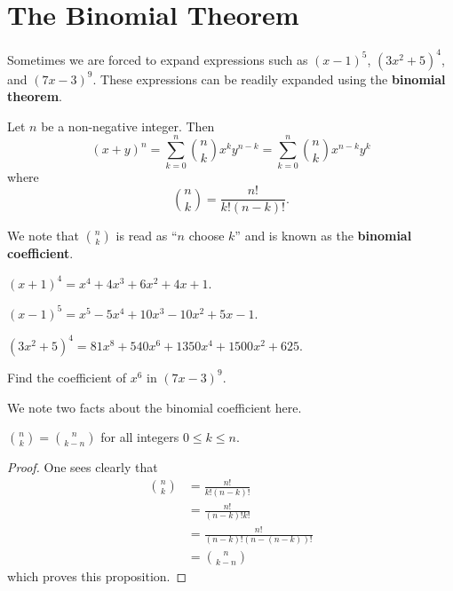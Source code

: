 \section{The Binomial Theorem}
Sometimes we are forced to expand expressions such as $(x-1)^5$, $(3x^2 + 5)^4$, and $(7x - 3)^9$. These expressions can be readily expanded using the \textbf{binomial theorem}.
\begin{theorem}\label{thrm-binomial}
    Let $n$ be a non-negative integer. Then
    \[
        (x+y)^n = \sum_{k=0}^n {n \choose k}x^ky^{n-k} = \sum_{k=0}^n {n \choose k}x^{n-k}y^k
    \]
    where
    \[
        {n \choose k} = \frac{n!}{k!(n-k)!}.
    \]
\end{theorem}
We note that ${n \choose k}$ is read as ``$n$ choose $k$'' and is known as the \textbf{binomial coefficient}.

\begin{example}
    $(x+1)^4 = x^4 + 4x^3 + 6x^2 + 4x + 1$.
\end{example}
\begin{example}
    $(x-1)^5 = x^5 - 5x^4 + 10x^3 - 10x^2 + 5x - 1$.
\end{example}
\begin{example}
    $(3x^2 + 5)^4 = 81x^8 + 540x^6 + 1350x^4 + 1500x^2 + 625$.
\end{example}

\begin{exercise}
    Find the coefficient of $x^6$ in $(7x-3)^9$.
\end{exercise}

We note two facts about the binomial coefficient here.
\begin{proposition}
    ${n\choose k} = {n\choose {k-n}}$ for all integers $0 \leq k \leq n$.
\end{proposition}
\begin{proof}
    One sees clearly that
    \begin{align*}
        {n\choose k} &= \frac{n!}{k!(n-k)!}\\
        &= \frac{n!}{(n-k)!k!}\\
        &= \frac{n!}{(n-k)!(n-(n-k))!}\\
        &= {n\choose {k-n}}
    \end{align*}
    which proves this proposition.
\end{proof}

